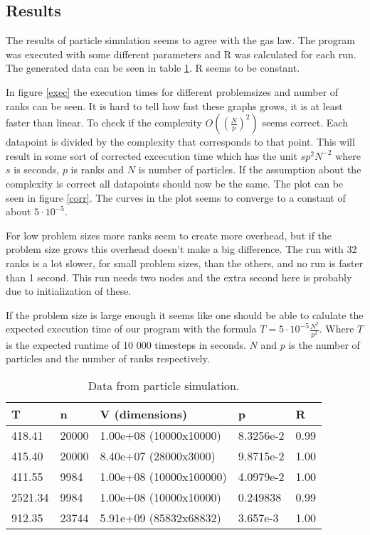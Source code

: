 \documentclass[a4paper,11pt]{article}
\begin{document}
\subsection{Results}
The results of particle simulation seems to agree with the gas law.
The program was executed with some different parameters and R was calculated for each run.
The generated data can be seen in table \ref{data}.
R seems to be constant.

In figure \ref{exec} the execution times for different problemsizes and number of ranks can be seen.
It is hard to tell how fast these graphs grows, it is at least faster than linear.
To check if the complexity $O((\frac{N}{p})^2)$ seems correct.
Each datapoint is divided by the complexity that corresponds to that point.
This will result in some sort of corrected excecution time which has the unit $sp^2N^{-2}$ where $s$ is seconds, $p$ is ranks and $N$ is number of particles.
If the assumption about the complexity is correct all datapoints should now be the same.
The plot can be seen in figure \ref{corr}.
The curves in the plot seems to converge to a constant of about $5 \cdot 10^{-5}$.

For low problem sizes more ranks seem to create more overhead, but if the problem size grows this overhead doesn't make a big difference.
The run with 32 ranks is a lot slower, for small problem sizes, than the others, and no run is faster than 1 second.
This run needs two nodes and the extra second here is probably due to initialization of these.

If the problem size is large enough it seems like one should be able to calulate the expected 
execution time of our program with the formula $T = 5 \cdot 10^{-5} \frac{N^2}{p^2}$.
Where $T$ is the expected runtime of 10 000 timesteps in seconds.
$N$ and $p$ is the number of particles and the number of ranks respectively.


\begin{table}[h!]
  \begin{center}
  \caption{Data from particle simulation.}
  \label{data}
  \begin{tabular}[h]{|l|l|l|l|l|}
    \hline
    T       & n     & V (dimensions)         & p          & R\\
    \hline
    418.41  & 20000 & 1.00e+08 (10000x10000) & 8.3256e-2  & 0.99 \\ 
    415.40  & 20000 & 8.40e+07 (28000x3000)  & 9.8715e-2  & 1.00 \\ 
    411.55  & 9984  & 1.00e+08 (10000x100000)& 4.0979e-2  & 1.00 \\ 
    2521.34 & 9984  & 1.00e+08 (10000x10000) & 0.249838   & 0.99 \\
    912.35  & 23744 & 5.91e+09 (85832x68832) & 3.657e-3   & 1.00 \\
    \hline
  \end{tabular}
  \end{center}
\end{table}
\end{document}
